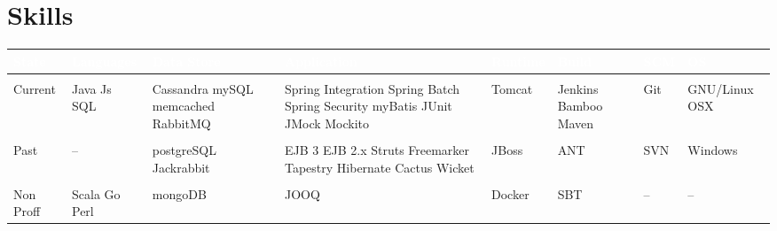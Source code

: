 \documentclass[a4paper]{article}
\begin{document}
\section*{\LARGE{Skills}} 


\begin{tabular}{| >{\centering\arraybackslash}m{1.2cm} |  >{\centering\arraybackslash}m{1.8cm} |  >{\centering\arraybackslash}m{2cm}  |  >{\centering\arraybackslash}m{2.8cm}  |  >{\centering\arraybackslash}m{1.4cm}  |  >{\centering\arraybackslash}m{1.2cm}  |  >{\centering\arraybackslash}m{0.8cm} |  >{\centering\arraybackslash}m{1.6cm}  |} \hline 
	\cellcolor{black}\textcolor{white}{State} & \cellcolor{black}\textcolor{white}{Languages} & \cellcolor{black}\textcolor{white}{Data Store} & \cellcolor{black}\textcolor{white}{Application} & \cellcolor{black}\textcolor{white}{Runtime} & \cellcolor{black}\textcolor{white}{Build} & \cellcolor{black}\textcolor{white}{SCM} & \cellcolor{black}\textcolor{white}{OS} \\ \hline  
	      & 	  & 	       &             &         &       &     &    \\
	Current & Java \newline Js \newline SQL \newline & Cassandra \newline mySQL \newline memcached \newline RabbitMQ & Spring Integration \newline Spring Batch \newline Spring Security \newline myBatis \newline JUnit \newline JMock \newline Mockito \newline & Tomcat & Jenkins \newline Bamboo \newline Maven & Git & GNU/Linux \newline OSX \\ \hline
	& & & & & & & \\
Past & --  & postgreSQL \newline Jackrabbit & EJB 3 \newline EJB 2.x \newline Struts \newline Freemarker \newline Tapestry \newline Hibernate \newline Cactus \newline Wicket \newline & JBoss & ANT & SVN & Windows \\ \hline
	    & & & & & & & \\
	Non \newline Proff \newline &  Scala \newline Go \newline Perl \newline & mongoDB & JOOQ & Docker & SBT & -- & -- \\ \hline
\end{tabular}
\end{document}
